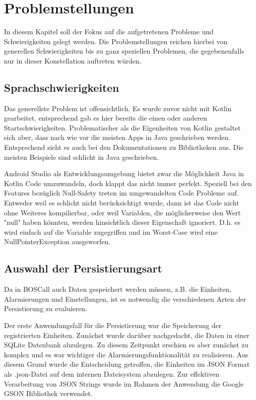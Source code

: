 \section{Problemstellungen}
\label{sec:problemstellungen}
In diesem Kapitel soll der Fokus auf die aufgetretenen Probleme und Schwierigkeiten gelegt werden. Die Problemstellungen reichen hierbei von generellen Schwierigkeiten bis zu ganz speziellen Problemen, die gegebenenfalls nur in dieser Konstellation auftreten würden.

\subsection{Sprachschwierigkeiten}
Das generellste Problem ist offensichtlich. Es wurde zuvor nicht mit Kotlin gearbeitet, entsprechend gab es hier bereits die einen oder anderen Startschwierigkeiten. Problematischer als die Eigenheiten von Kotlin gestaltet sich aber, dass nach wie vor die meisten Apps in Java geschrieben werden. Entsprechend sieht es auch bei den Dokumentationen zu Bibliotheken aus. Die meisten Beispiele sind schlicht in Java geschrieben.

Android Studio als Entwicklungsumgebung bietet zwar die Möglichkeit Java in Kotlin Code umzuwandeln, doch klappt das nicht immer perfekt. Speziell bei den Features bezüglich Null-Safety treten im umgewandelten Code Probleme auf. Entweder weil es schlicht nicht berücksichtigt wurde, dann ist das Code nicht ohne Weiteres kompilierbar, oder weil Variablen, die möglicherweise den Wert "null" haben könnten, werden hinsichtlich dieser Eigenschaft ignoriert. D.h. es wird einfach auf die Variable zugegriffen und im Worst-Case wird eine NullPointerException ausgeworfen.

\subsection{Auswahl der Persistierungsart}
Da in BOSCall auch Daten gespeichert werden müssen, z.B. die Einheiten, Alarmierungen und Einstellungen, ist es notwendig die verschiedenen Arten der Persistierung zu evaluieren.

Der erste Anwendungsfall für die Persistierung war die Speicherung der registrierten Einheiten. Zunächst wurde darüber nachgedacht, die Daten in einer SQLite Datenbank abzulegen. Zu diesem Zeitpunkt erschien es aber zunächst zu komplex und es war wichtiger die Alarmierungsfunktionalität zu realisieren. Aus diesem Grund wurde die Entscheidung getroffen, die Einheiten im JSON Format als .json-Datei auf dem internen Dateisystem abzulegen. Zur effektiven Verarbeitung von JSON Strings wurde im Rahmen der Anwendung die Google GSON Bibliothek\cite{Github:GSON} verwendet.


